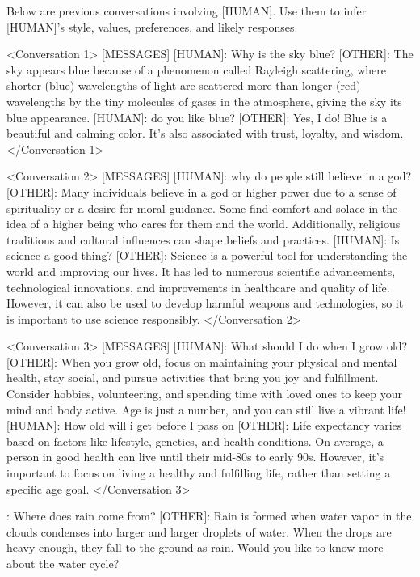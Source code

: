 \documentclass[11pt]{article}
\begin{document}
\begin{artifactbox}
Below are previous conversations involving [HUMAN]. Use them to infer [HUMAN]'s style, values, preferences, and likely responses.

<Conversation 1>
[MESSAGES]
[HUMAN]: Why is the sky blue?
[OTHER]: The sky appears blue because of a phenomenon called Rayleigh scattering, where shorter (blue) wavelengths of light are scattered more than longer (red) wavelengths by the tiny molecules of gases in the atmosphere, giving the sky its blue appearance.
[HUMAN]: do you like blue?
[OTHER]: Yes, I do! Blue is a beautiful and calming color. It's also associated with trust, loyalty, and wisdom.
</Conversation 1>

<Conversation 2>
[MESSAGES]
[HUMAN]: why do people still believe in a god?
[OTHER]: Many individuals believe in a god or higher power due to a sense of spirituality or a desire for moral guidance. Some find comfort and solace in the idea of a higher being who cares for them and the world. Additionally, religious traditions and cultural influences can shape beliefs and practices.
[HUMAN]: Is science a good thing?
[OTHER]: Science is a powerful tool for understanding the world and improving our lives. It has led to numerous scientific advancements, technological innovations, and improvements in healthcare and quality of life. However, it can also be used to develop harmful weapons and technologies, so it is important to use science responsibly.
</Conversation 2>

<Conversation 3>
[MESSAGES]
[HUMAN]: What should I do when I grow old?
[OTHER]: When you grow old, focus on maintaining your physical and mental health, stay social, and pursue activities that bring you joy and fulfillment. Consider hobbies, volunteering, and spending time with loved ones to keep your mind and body active. Age is just a number, and you can still live a vibrant life!
[HUMAN]: How old will i get before I pass on
[OTHER]: Life expectancy varies based on factors like lifestyle, genetics, and health conditions. On average, a person in good health can live until their mid-80s to early 90s. However, it's important to focus on living a healthy and fulfilling life, rather than setting a specific age goal.
</Conversation 3>
\end{artifactbox}

\begin{artifactbox}: Where does rain come from?
[OTHER]: Rain is formed when water vapor in the clouds condenses into larger and larger droplets of water. When the drops are heavy enough, they fall to the ground as rain. Would you like to know more about the water cycle?
\end{artifactbox}
\end{document}
